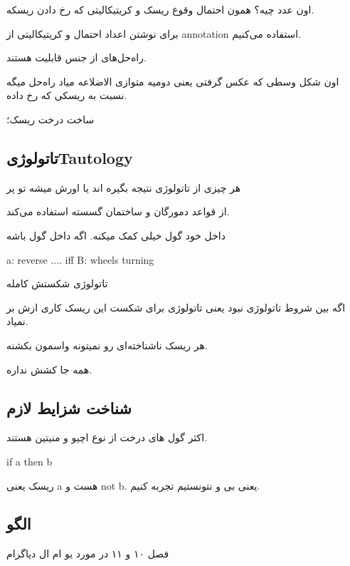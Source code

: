 اون عدد چیه؟ همون احتمال وقوع ریسک و کریتیکالیتی که رخ دادن ریسکه.

برای نوشتن اعداد احتمال و کریتیکالیتی از annotation استفاده می‌کنیم.

راه‌حل‌های از جنس قابلیت هستند.

اون شکل وسطی که عکس گرفتی یعنی دومیه متوازی الاضلاعه میاد راه‌حل میگه نسبت به
ریسکی که رخ داده.

ساخت درخت ریسک؛

\subsection{تاتولوژیTautology}

هر چیزی از تاتولوژی نتیجه بگیره اند یا اورش میشه تو پر

از قواعد دمورگان و ساختمان گسسته استفاده می‌کند.

داخل خود گول خیلی کمک میکنه. اگه داخل گول باشه

a: reverse .... iff B: wheels turning

تاتولوژی شکستش کامله

اگه بین شروط تاتولوژی نبود یعنی تاتولوژی برای شکست این ریسک کاری ازش بر نمیاد.

هر ریسک ناشناخته‌ای رو نمیتونه واسمون بکشنه.

همه جا کشش نداره.

\subsection{شناخت شزایط لازم}

اکثر گول ‌های درخت از نوع اچیو و منیتین هستند.

if a then b

ریسک یعنی a هست و not b. یعنی بی و نتونستیم تجربه کنیم.

\subsection{الگو}


فصل ۱۰ و ۱۱ در مورد یو ام ال
دیاگرام 
